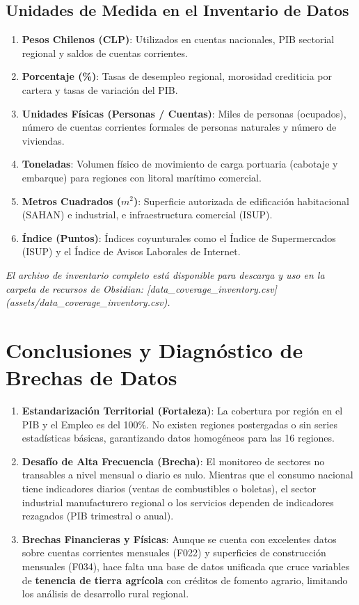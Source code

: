 \documentclass[11pt,a4paper]{article}
\begin{document}
\subsection{Unidades de Medida en el Inventario de Datos}
\begin{enumerate}
  \item \textbf{Pesos Chilenos (CLP)}: Utilizados en cuentas nacionales, PIB sectorial regional y saldos de cuentas corrientes.
  \item \textbf{Porcentaje (\%)}: Tasas de desempleo regional, morosidad crediticia por cartera y tasas de variación del PIB.
  \item \textbf{Unidades Físicas (Personas / Cuentas)}: Miles de personas (ocupados), número de cuentas corrientes formales de personas naturales y número de viviendas.
  \item \textbf{Toneladas}: Volumen físico de movimiento de carga portuaria (cabotaje y embarque) para regiones con litoral marítimo comercial.
  \item \textbf{Metros Cuadrados ($m^2$)}: Superficie autorizada de edificación habitacional (SAHAN) e industrial, e infraestructura comercial (ISUP).
  \item \textbf{Índice (Puntos)}: Índices coyunturales como el Índice de Supermercados (ISUP) y el Índice de Avisos Laborales de Internet.

\end{enumerate}
\textit{El archivo de inventario completo está disponible para descarga y uso en la carpeta de recursos de Obsidian: [data\_coverage\_inventory.csv](assets/data\_coverage\_inventory.csv).}


\strut


\section{Conclusiones y Diagnóstico de Brechas de Datos}

\begin{enumerate}
  \item \textbf{Estandarización Territorial (Fortaleza)}: La cobertura por región en el PIB y el Empleo es del 100\%. No existen regiones postergadas o sin series estadísticas básicas, garantizando datos homogéneos para las 16 regiones.
  \item \textbf{Desafío de Alta Frecuencia (Brecha)}: El monitoreo de sectores no transables a nivel mensual o diario es nulo. Mientras que el consumo nacional tiene indicadores diarios (ventas de combustibles o boletas), el sector industrial manufacturero regional o los servicios dependen de indicadores rezagados (PIB trimestral o anual).
  \item \textbf{Brechas Financieras y Físicas}: Aunque se cuenta con excelentes datos sobre cuentas corrientes mensuales (F022) y superficies de construcción mensuales (F034), hace falta una base de datos unificada que cruce variables de \textbf{tenencia de tierra agrícola} con créditos de fomento agrario, limitando los análisis de desarrollo rural regional.
\end{enumerate}
\end{document}
